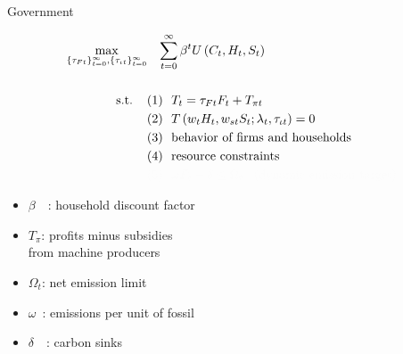 \documentclass[11pt,aspectratio=169]{beamer}
\begin{document}
\begin{frame}{Government}
	\hypertarget{gov}{}
	\vspace{-4mm}
	\centering
	\begin{minipage}[t!]{1\textwidth}
		\begin{align*}
			\max_{\{\tau_{Ft}\}_{t=0}^{\infty}, \{\tau_{\iota t}\}_{t=0}^{\infty}}&\hspace{3mm} \sum_{t=0}^{\infty}\beta^t U\left(C_t,H_t, S_t\right)\\ \ \\
			\text{s.t.} \hspace{4mm}
			&{ (1)\ \ T_t={{\tau_{Ft}}}F_{t}}+T_{\pi t}\\
			&{(2)\ \ T\left(w_{t}H_{t},w_{st}S_{t}; \lambda_t, \tau_{\iota t}\right)=0}\\
			& {(3)\ \  \text{behavior of firms and households}}\\
			& {(4)\ \ \text{resource constraints} }\\
			& \textcolor{black!1}{(5)\ \  {\omega F_t-\delta \leq\Omega_t } \hspace{3mm} {\text{(dynamic emission target)}}}
		\end{align*}
	\end{minipage}
	
	\small
	\vspace{-4mm}
	\hspace{-10mm}
	\begin{minipage}[t!]{0.5\textwidth}
		\vspace{7mm}
		\begin{itemize}
			\item[] $\beta$\ \ : household discount factor\vspace{-2mm}
			\item[] $T_\pi$: profits minus subsidies \\ \hspace{5.5mm} from machine producers \vspace{0mm}
		\end{itemize}
	\end{minipage}
	\begin{minipage}[t!]{0.45\textwidth}
		\vspace{8mm}
		\begin{itemize}
			\item[] \textcolor{black!1}{$\Omega_{t}$: net emission limit}
			\vspace{-2mm}	
			\item[] \textcolor{black!1}{$\omega$\ : emissions per unit of fossil} \vspace{-0.8mm}
			\item[] \textcolor{black!1}{$\delta$\ \ : carbon sinks \tiny{\citep{VanVuuren2018AlternativeTechnologies}}}
		\end{itemize}
	\end{minipage}
\end{frame}
\end{document}
